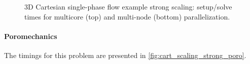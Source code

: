 \begin{figure} [htbp]
  \begin{subfigure}[t]{0.48\textwidth}
    \centering
    
  \end{subfigure}
  \hfill
  \begin{subfigure}[t]{0.48\textwidth}
    \centering
    
  \end{subfigure}
  \begin{subfigure}[t]{0.48\textwidth}
    \centering
    
  \end{subfigure}
  \hfill
  \begin{subfigure}[t]{0.48\textwidth}
    \centering
    
  \end{subfigure}
  \caption[3D Cartesian single-phase flow example strong scaling]{3D Cartesian single-phase flow example strong scaling: setup/solve times for multicore (top) and multi-node (bottom) parallelization.}
  \label{fig:cart_scaling_strong_flow}
\end{figure}

\paragraph{Poromechanics}
The timings for this problem are presented in \cref{fig:cart_scaling_strong_poro}.


